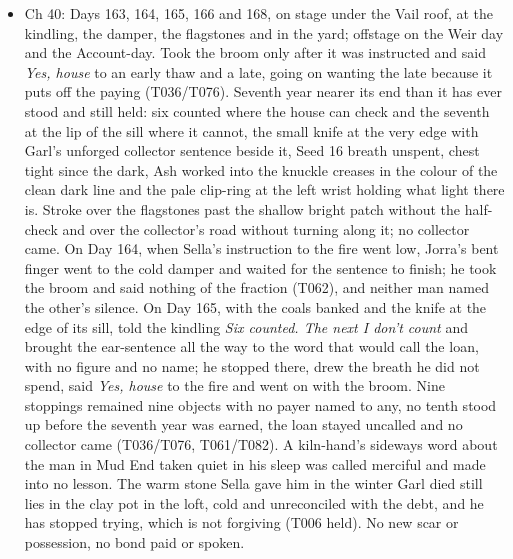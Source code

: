 \documentclass{design/chronicle}
\begin{document}
{\begin{itemize}[leftmargin=1.4em,itemsep=1pt,topsep=3pt,parsep=0pt]
\item Ch 40: Days 163, 164, 165, 166 and 168, on stage under the Vail roof, at the kindling, the damper, the flagstones and in the yard; offstage on the Weir day and the Account-day. Took the broom only after it was instructed and said \emph{Yes, house} to an early thaw and a late, going on wanting the late because it puts off the paying (T036/T076). Seventh year nearer its end than it has ever stood and still held: six counted where the house can check and the seventh at the lip of the sill where it cannot, the small knife at the very edge with Garl’s unforged collector sentence beside it, Seed 16 breath unspent, chest tight since the dark, Ash worked into the knuckle creases in the colour of the clean dark line and the pale clip-ring at the left wrist holding what light there is. Stroke over the flagstones past the shallow bright patch without the half-check and over the collector’s road without turning along it; no collector came. On Day 164, when Sella’s instruction to the fire went low, Jorra’s bent finger went to the cold damper and waited for the sentence to finish; he took the broom and said nothing of the fraction (T062), and neither man named the other’s silence. On Day 165, with the coals banked and the knife at the edge of its sill, told the kindling \emph{Six counted. The next I don’t count} and brought the ear-sentence all the way to the word that would call the loan, with no figure and no name; he stopped there, drew the breath he did not spend, said \emph{Yes, house} to the fire and went on with the broom. Nine stoppings remained nine objects with no payer named to any, no tenth stood up before the seventh year was earned, the loan stayed uncalled and no collector came (T036/T076, T061/T082). A kiln-hand’s sideways word about the man in Mud End taken quiet in his sleep was called merciful and made into no lesson. The warm stone Sella gave him in the winter Garl died still lies in the clay pot in the loft, cold and unreconciled with the debt, and he has stopped trying, which is not forgiving (T006 held). No new scar or possession, no bond paid or spoken.

\end{itemize}

\begin{itemize}[leftmargin=1.4em,itemsep=1pt,topsep=3pt,parsep=0pt]


\end{itemize}}
\end{document}
